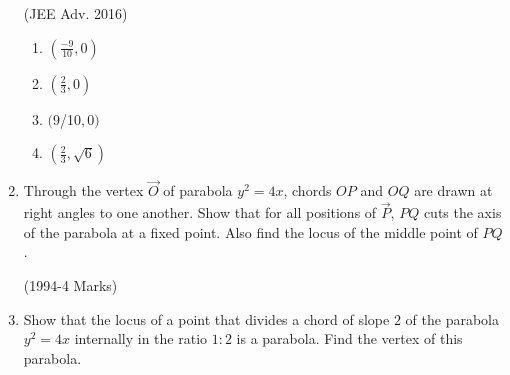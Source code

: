 \begin{enumerate}
         \hfill(JEE Adv. 2016)
\begin{enumerate}
     \item $(\frac{-9}{10},0)$   
     \item $(\frac{2}{3},0)$     
     \item $($9/10$,0)$ 
    \item $(\frac{2}{3},\sqrt{6})$ 
    \end{enumerate}
		
      \item Through the vertex $\vec{O}$ of parabola $y^2=4x$, chords $OP$ and $OQ$ are drawn at right angles to one another. Show that for all positions of $\vec{P}$, $PQ$ cuts the axis of the parabola at a fixed point. Also find the locus of the middle point of $PQ$. 

		\hfill(1994-4 Marks)
		
      \item Show that the locus of a point that divides a chord of slope $2$ of the parabola $y^2=4x$ internally in the ratio $1:2$ is a parabola. Find the vertex of this parabola. 


\end{enumerate}
